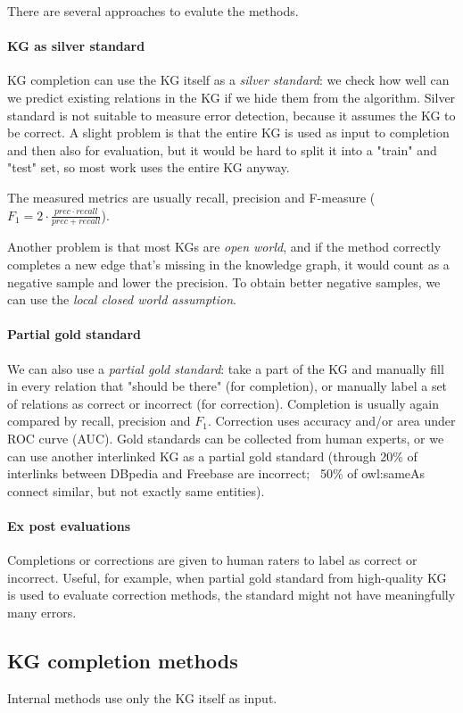 There are several approaches to evalute the methods.
\paragraph{KG as silver standard}
KG completion can use the KG itself as a \textit{silver standard}: we check how
well can we predict existing relations in the KG if we hide them from the
algorithm. Silver standard is not suitable to measure error detection, because
it assumes the KG to be correct.
A slight problem is that the entire KG is used as input to completion and then
also for evaluation, but it would be hard to split it into a "train" and "test"
set, so most work uses the entire KG anyway.

The measured metrics are usually recall, precision and F-measure ($F_1 =
2\cdot\frac{prec \cdot recall}{prec + recall}$).

Another problem is that most KGs are \textit{open world}, and if the method
correctly completes a new edge that's missing in the knowledge graph, it would
count as a negative sample and lower the precision. To obtain better negative
samples, we can use the \textit{local closed world assumption}.

\paragraph{Partial gold standard}
We can also use a \textit{partial gold standard}: take a part of the KG and
manually fill in every relation that "should be there" (for completion), or
manually label a set of relations as correct or incorrect (for correction).
Completion is usually again compared by recall, precision and $F_1$.
Correction uses accuracy and/or area under ROC curve (AUC).
Gold standards can be collected from human experts, or we can use another
interlinked KG as a partial gold standard (through 20\% of interlinks between
DBpedia and Freebase are incorrect; ~50\% of owl:sameAs connect similar, but not
exactly same entities).

\paragraph{Ex post evaluations}
Completions or corrections are given to human raters to label as correct or
incorrect. Useful, for example, when partial gold standard from high-quality KG
is used to evaluate correction methods, the standard might not have
meaningfully many errors.

\subsection{KG completion methods}
Internal methods use only the KG itself as input.

